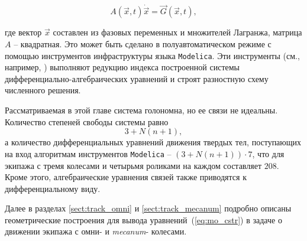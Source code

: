 $$ A(\vec{x}, t)\dot{\vec{x}} = \vec{G}(\vec{x}, t), $$

где вектор $\vec{x}$ составлен из фазовых переменных и множителей Лагранжа, матрица $A$ -- квадратная.
Это может быть сделано в полуавтоматическом режиме с помощью инструментов инфраструктуры языка \texttt{Modelica}. Эти инструменты (см., например, \cite{Fritzson}) выполняют редукцию индекса построенной системы дифференциально-алгебраических уравнений и строят разностную схему численного решения.

Рассматриваемая в этой главе система голономна, но ее связи не идеальны. Количество степеней свободы системы равно
$$ 3 + N(n + 1),$$
а количество дифференциальных уравнений движения твердых тел, поступающих на вход алгоритмам инструментов \texttt{Modelica} -- $(3 + N(n + 1)) \cdot 7$, что для экипажа с тремя колесами и четырьмя роликами на каждом составляет $208$. Кроме этого, алгебраические уравнения связей также приводятся к дифференциальному виду.

Далее в разделах \ref{sect:track_omni} и \ref{sect:track_mecanum} подробно описаны геометрические построения для вывода уравнений~(\ref{eq:mo_cstr}) в задаче о движении экипажа с омни- и \textit{mecanum}- колесами.
